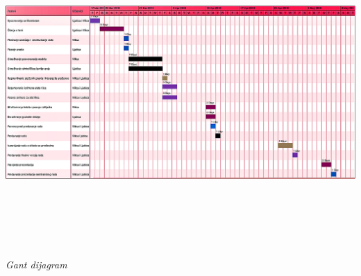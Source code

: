\documentclass{article}
\begin{document}
				  	
\centerline{\includegraphics[width=550pt,height=330pt]{GantDijagram}}

\begin{center}
	\textit{Gant dijagram}
\end{center}

	
	
\end{document}

